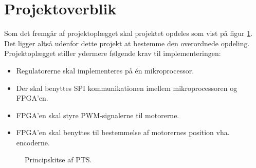 \section{Projektoverblik}
\label{sec:projektoverblik}
Som det fremgår af projektoplægget skal projektet opdeles som vist på 
figur \ref{fig:overview_openloop_PTS}. 
Det ligger altså udenfor dette projekt at bestemme den overordnede opdeling.
Projektoplægget stiller ydermere følgende krav til implementeringen:
\begin{itemize}
\itemsep1pt
  \item Regulatorerne skal implementeres på én mikroprocessor.
  \item Der skal benyttes SPI kommunikationen imellem mikroprocessoren og FPGA’en.
  \item FPGA’en skal styre PWM-signalerne til motorerne.
  \item FPGA’en skal benyttes til bestemmelse af motorernes position vha. encoderne.
\end{itemize}

\bigskip

\begin{figure}[!th]
\centering
\begin{tikzpicture}[auto, node distance=1cm,>=latex']

\end{tikzpicture}
\caption[Principskitse af PTS]{Principskitse af PTS.}
\label{fig:overview_openloop_PTS}
\end{figure}




